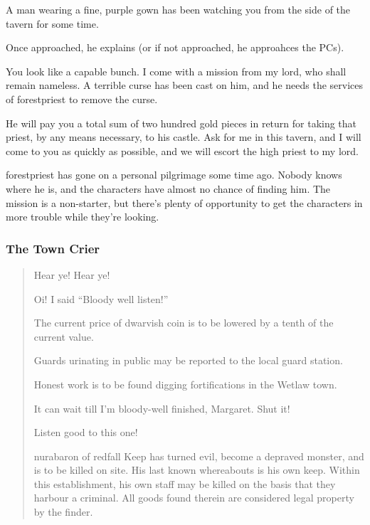 \begin{boxtext}
	A man wearing a fine, purple gown has been watching you from the side of the tavern for some time.
\end{boxtext}

Once approached, he explains (or if not approached, he approahces the PCs).

\begin{speechtext}
	You look like a capable bunch.  I come with a mission from my lord, who shall remain nameless.  A terrible curse has been cast on him, and he needs the services of \gls{forestpriest} to remove the curse.

	He will pay you a total sum of two hundred gold pieces in return for taking that priest, by any means necessary, to his castle.  Ask for me in this tavern, and I will come to you as quickly as possible, and we will escort the high priest to my lord.
\end{speechtext}

\gls{forestpriest} has gone on a personal pilgrimage some time ago.  Nobody knows where he is, and the characters have almost no chance of finding him.  The mission is a non-starter, but there's plenty of opportunity to get the characters in more trouble while they're looking.

\label{nathaniel}
\humandiplomat

\subsubsection{The Town Crier}
\begin{boxtext}
	\begin{verse}
		Hear ye! Hear ye!

		Oi! I said ``Bloody well listen!''

		The current price of dwarvish coin is to be lowered by a tenth of the current value.

		Guards urinating in public may be reported to the local guard station.

		Honest work is to be found digging fortifications in the Wetlaw town.

		It can wait till I'm bloody-well finished, Margaret.  Shut it!

		Listen good to this one!

		\gls{nurabaron} of \gls{redfall} Keep has turned evil, become a depraved monster, and is to be killed on site.  His last known whereabouts is his own keep.  Within this establishment, his own staff may be killed on the basis that they harbour a criminal.  All goods found therein are considered legal property by the finder.


	\end{verse}
\end{boxtext}

